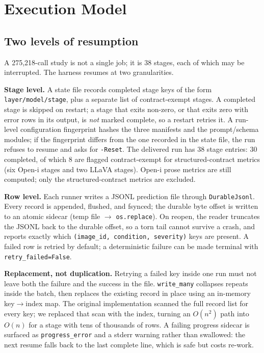 \section{Execution Model}
\label{sec:execution}

\subsection{Two levels of resumption}

A 275,218-call study is not a single job; it is 38 stages, each of which may be interrupted. The harness resumes at two granularities.

\textbf{Stage level.} A state file records completed stage keys of the form \texttt{layer/model/stage}, plus a separate list of contract-exempt stages. A completed stage is skipped on restart; a stage that exits non-zero, or that exits zero with error rows in its output, is \emph{not} marked complete, so a restart retries it. A run-level configuration fingerprint hashes the three manifests and the prompt/schema modules; if the fingerprint differs from the one recorded in the state file, the run refuses to resume and asks for \texttt{-Reset}. The delivered run has 38 stage entries: 30 completed, of which 8 are flagged contract-exempt for structured-contract metrics (six Open-i stages and two LLaVA stages). Open-i prose metrics are still computed; only the structured-contract metrics are excluded.

\textbf{Row level.} Each runner writes a JSONL prediction file through \texttt{DurableJsonl}. Every record is appended, flushed, and fsynced; the durable byte offset is written to an atomic sidecar (temp file $\rightarrow$ \texttt{os.replace}). On reopen, the reader truncates the JSONL back to the durable offset, so a torn tail cannot survive a crash, and reports exactly which \texttt{(image\_id, condition, severity)} keys are present. A failed row is retried by default; a deterministic failure can be made terminal with \texttt{retry\_failed=False}.

\textbf{Replacement, not duplication.} Retrying a failed key inside one run must not leave both the failure and the success in the file. \texttt{write\_many} collapses repeats inside the batch, then replaces the existing record in place using an in-memory key$\rightarrow$index map. The original implementation scanned the full record list for every key; we replaced that scan with the index, turning an $O(n^2)$ path into $O(n)$ for a stage with tens of thousands of rows. A failing progress sidecar is surfaced as \texttt{progress\_error} and a stderr warning rather than swallowed: the next resume falls back to the last complete line, which is safe but costs re-work.

